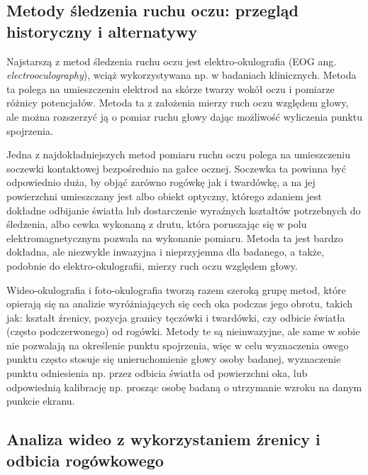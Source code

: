 \documentclass[a4paper,twoside,12pt]{book}
\newcommand{\obcy}[1]{\emph{#1}}
\newcommand{\english}[1]{{\selectlanguage{british}\obcy{#1}}}
\begin{document}
\subsection{Metody śledzenia ruchu oczu: przegląd historyczny i alternatywy}
\label{subsec:metody-sledzenia-ruchu-oczu-przeglad-historyczny-i-alternatywy}

Najstarszą z metod śledzenia ruchu oczu jest elektro-okulografia (EOG ang. \english{electrooculography}), wciąż wykorzystywana np. w badaniach klinicznych. Metoda ta polega na umieszczeniu elektrod na skórze twarzy wokół oczu i pomiarze różnicy potencjałów. Metoda ta z założenia mierzy ruch oczu względem głowy, ale można rozszerzyć ją o pomiar ruchu głowy dając możliwość wyliczenia punktu spojrzenia. 

Jedna z najdokładniejszych metod pomiaru ruchu oczu polega na umieszczeniu soczewki kontaktowej bezpośrednio na gałce ocznej. Soczewka ta powinna być odpowiednio duża, by objąć zarówno rogówkę jak i twardówkę, a na jej powierzchni umieszczany jest albo obiekt optyczny, którego zdaniem jest dokładne odbijanie światła lub dostarczenie wyraźnych kształtów potrzebnych do śledzenia, albo cewka wykonaną z drutu, która poruszając się w polu elektromagnetycznym pozwala na wykonanie pomiaru. Metoda ta jest bardzo dokładna, ale niezwykle inwazyjna i nieprzyjemna dla badanego, a także, podobnie do elektro-okulografii, mierzy ruch oczu względem głowy.

Wideo-okulografia i foto-okulografia tworzą razem szeroką grupę metod, które opierają się na analizie wyróżniających się cech oka podczas jego obrotu, takich jak: kształt źrenicy, pozycja granicy tęczówki i twardówki, czy odbicie światła (często podczerwonego) od rogówki. Metody te są nieinwazyjne, ale same w sobie nie pozwalają na określenie punktu spojrzenia, więc w celu wyznaczenia owego punktu często stosuje się unieruchomienie głowy osoby badanej, wyznaczenie punktu odniesienia np. przez odbicia światła od powierzchni oka, lub odpowiednią kalibrację np. prosząc osobę badaną o utrzymanie wzroku na danym punkcie ekranu.

\subsection{Analiza wideo z wykorzystaniem źrenicy i odbicia rogówkowego}
\label{subsec:analiza-wideo-z-wykorzystaniem-zrenicy-i-odbicia-rogowkowego}
\end{document}
